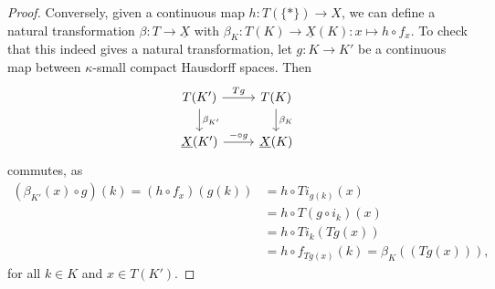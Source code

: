 \documentclass{article}
\begin{document}
\begin{proof}
    Conversely, given a continuous map $h\colon T(\{*\}) \to X$,
    we can define a natural transformation
    $\beta \colon T \to \underline{X}$
    with $\beta_K \colon T(K) \to \underline{X}(K)\colon x \mapsto h\circ f_x$.
    To check that this indeed gives a natural transformation, let
    $g\colon K \to K'$ be a continuous map between $\kappa$-small
    compact Hausdorff spaces. Then
    \begin{equation*}
        \begin{tikzcd}
            T(K') \rar["Tg"] \dar["\beta_{K'}"] & T(K) \dar["\beta_K"] \\
            \underline{X}(K') \rar["-\circ g"] & \underline{X}(K)
        \end{tikzcd}
    \end{equation*}
    commutes, as
    \begin{align*}
        (\beta_{K'}(x)\circ g)(k)
        = (h\circ f_x)(g(k))
         & = h\circ Ti_{g(k)}(x)     \\
         & = h\circ T(g\circ i_k)(x) \\
         & = h\circ Ti_k (Tg(x))     \\
         & = h\circ f_{Tg(x)}(k)
        = \beta_K((Tg(x))),
    \end{align*}
    for all $k\in K$ and $x\in T(K')$.
\end{proof}
\end{document}
